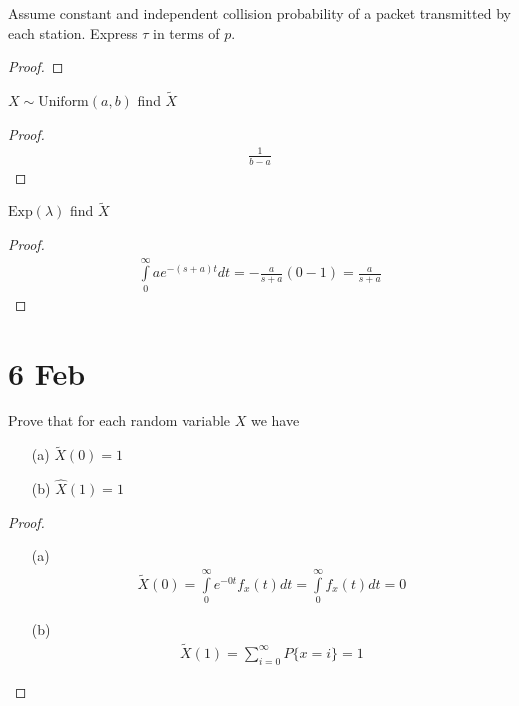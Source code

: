 \begin{prob}
Assume constant and independent collision probability of a packet transmitted by each station. Express $\tau$ in terms of $p$.
\end{prob}

\begin{proof}

\end{proof}
\vskip 0.6in



\begin{prob}
$X \sim \text{Uniform}(a, b)$ find $\tilde{X}$
\end{prob}

\begin{proof}
\begin{gather*}
    \frac{1}{b-a}
\end{gather*}
\end{proof}
\vskip 0.6in



\begin{prob}
$\text{Exp}(\lambda)$ find $\tilde{X}$
\end{prob}

\begin{proof}
\begin{gather*}
    \int\limits_{0}^{\infty} a e^{-(s+a)t}dt
    = -\frac{a}{s+a}(0-1)
    = \frac{a}{s+a}
\end{gather*}
\end{proof}
\vskip 0.6in



\section{6 Feb}

\begin{prob}
Prove that for each random variable $X$ we have
\begin{itemize}
\item[(a)] $\widetilde{X}(0)=1$
\item[(b)] $\widehat{X}(1)=1$
\end{itemize}
\end{prob}

\begin{proof}
\begin{itemize}
\item[(a)] 
    \begin{gather*}
        \widetilde{X}(0)
        = \int\limits_{0}^{\infty} e^{-0t} f_x(t)dt
        = \int\limits_{0}^{\infty} f_x(t)dt
        = 0
    \end{gather*}
\item[(b)] 
    \begin{gather*}
        \widetilde{X}(1)
        = \sum\limits_{i = 0}^{\infty} P\{x = i\}
        = 1
    \end{gather*}
\end{itemize}
\end{proof}
\vskip 0.6in



